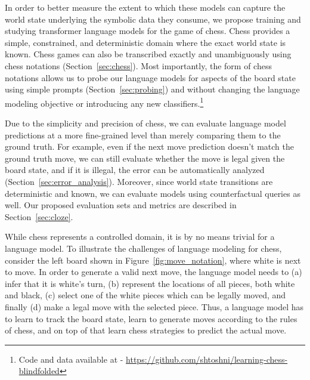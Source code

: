 \documentclass[12pt]{thesis-umich}[thesis]
\begin{document}
In order to better measure the extent to which these models can capture the world state underlying the symbolic data they consume, we propose training and studying
transformer language models for the game of chess.
Chess provides a simple, constrained, and deterministic domain where the exact world state is known.
Chess games can also be transcribed exactly and unambiguously using chess notations (Section~\ref{sec:chess}).
Most importantly, the form of chess notations allows us to probe our language models for aspects of the board state using simple prompts (Section~\ref{sec:probing}) and without changing the language modeling objective or introducing any new classifiers.\footnote{Code and data available at - \url{https://github.com/shtoshni/learning-chess-blindfolded}}



Due to the simplicity and precision of chess, we can evaluate language model predictions at a more fine-grained level than merely comparing them to the ground truth.
For example, even if the next move prediction doesn't match the ground truth move, we can still evaluate whether the move is legal given the board state, and if it is illegal, the error can be automatically analyzed (Section~\ref{sec:error_analysis}).
Moreover, since world state transitions are deterministic and known, we can  evaluate models using counterfactual queries as well.
Our proposed evaluation sets and metrics are described in Section~\ref{sec:cloze}.



While chess represents a controlled domain,
it is by no means trivial for a language model.
To illustrate the challenges of language modeling for chess,
consider the left board shown in Figure~\ref{fig:move_notation}, where white is next to move.
In order to generate a valid next move, the language model needs to (a) infer that it is white's turn, (b) represent the locations of all pieces, both white and black, (c) select one of the white pieces which can be legally moved, and finally (d) make a legal move with the selected piece.
Thus, a language model has to learn to track the board state, learn to generate moves according to the rules of chess, and on top of that learn chess strategies to predict the actual move. 
\end{document}
